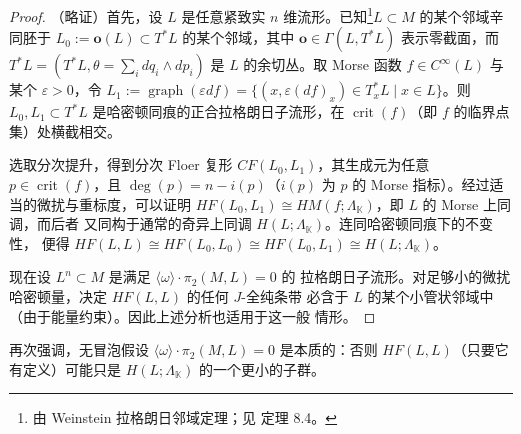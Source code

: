 \begin{proof}
（略证）首先，设 $L$ 是任意紧致实 $n$ 维流形。已知\footnote{由 Weinstein
拉格朗日邻域定理；见 \cite{Sil12} 定理 8.4。}$L\subset M$ 的某个邻域辛同胚于
$L_0:=\mathbf o(L)\subset T^*L$ 的某个邻域，其中
$\mathbf o\in\Gamma(L,T^*L)$ 表示零截面，而
$T^*L=(T^*L,\theta=\sum_i dq_i\wedge dp_i)$ 是 $L$ 的余切丛。取 Morse 函数
$f\in C^\infty(L)$ 与某个 $\varepsilon>0$，令
$L_1:=\operatorname{graph}(\varepsilon df)
=\{(x,\varepsilon(df)_x)\in T_x^*L\mid x\in L\}$。则
$L_0,L_1\subset T^*L$ 是哈密顿同痕的正合拉格朗日子流形，在
$\operatorname{crit}(f)$（即 $f$ 的临界点集）处横截相交。

选取分次提升，得到分次 Floer 复形 $CF(L_0,L_1)$，其生成元为任意
$p\in\operatorname{crit}(f)$，且 $\deg(p)=n-i(p)$（$i(p)$ 为 $p$ 的 Morse
指标）。经过适当的微扰与重标度，可以证明
$HF(L_0,L_1)\cong HM(f;\Lambda_{\mathbb K})$，即 $L$ 的 Morse 上同调，而后者
又同构于通常的奇异上同调 $H(L;\Lambda_{\mathbb K})$。连同哈密顿同痕下的不变性，
便得 $HF(L,L)\cong HF(L_0,L_0)\cong HF(L_0,L_1)\cong H(L;\Lambda_{\mathbb K})$。

现在设 $L^n\subset M$ 是满足 $\langle\omega\rangle\cdot\pi_2(M,L)=0$ 的
拉格朗日子流形。对足够小的微扰哈密顿量，决定 $HF(L,L)$ 的任何 $J$-全纯条带
必含于 $L$ 的某个小管状邻域中（由于能量约束）。因此上述分析也适用于这一般
情形。
\end{proof}




再次强调，无冒泡假设 $\langle\omega\rangle\cdot\pi_2(M,L)=0$ 是本质的：否则
$HF(L,L)$（只要它有定义）可能只是 $H(L;\Lambda_{\mathbb K})$ 的一个更小的子群。

